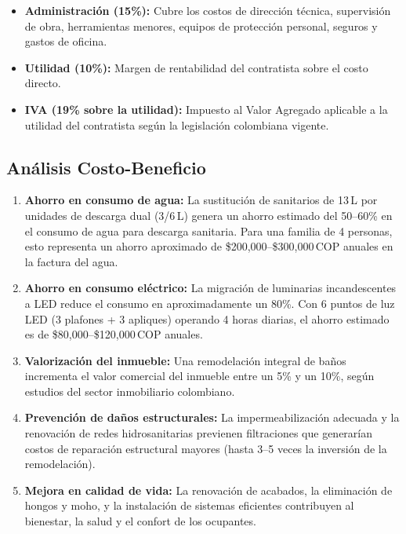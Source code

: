 ﻿\documentclass[12pt]{article}
\begin{document}
\begin{itemize}[noitemsep]
  \item {\bfseries Administración (15\%):} Cubre los costos de dirección técnica,
  supervisión de obra, herramientas menores, equipos de protección personal, seguros y
  gastos de oficina.
  \item {\bfseries Utilidad (10\%):} Margen de rentabilidad del contratista sobre el costo directo.
  \item {\bfseries IVA (19\% sobre la utilidad):} Impuesto al Valor Agregado aplicable a la utilidad
  del contratista según la legislación colombiana vigente.
\end{itemize}

\subsection{Análisis Costo-Beneficio}

\begin{enumerate}[noitemsep]
  \item {\bfseries Ahorro en consumo de agua:} La sustitución de sanitarios de 13\,L por unidades
  de descarga dual (3/6\,L) genera un ahorro estimado del 50--60\% en el consumo de agua para
  descarga sanitaria. Para una familia de 4 personas, esto representa un ahorro aproximado de
  \$200,000--\$300,000\,COP anuales en la factura del agua.
  \item {\bfseries Ahorro en consumo eléctrico:} La migración de luminarias incandescentes a
  LED reduce el consumo en aproximadamente un 80\%. Con 6 puntos de luz LED (3 plafones + 3 apliques)
  operando 4 horas diarias, el ahorro estimado es de \$80,000--\$120,000\,COP anuales.
  \item {\bfseries Valorización del inmueble:} Una remodelación integral de baños
  incrementa el valor comercial del inmueble entre un 5\% y un 10\%, según estudios del sector
  inmobiliario colombiano.
  \item {\bfseries Prevención de daños estructurales:} La impermeabilización adecuada y la
  renovación de redes hidrosanitarias previenen filtraciones que generarían costos de
  reparación estructural mayores (hasta 3--5 veces la inversión de la remodelación).
  \item {\bfseries Mejora en calidad de vida:} La renovación de acabados, la eliminación de
  hongos y moho, y la instalación de sistemas eficientes contribuyen al bienestar, la salud y el
  confort de los ocupantes.
\end{enumerate}
\end{document}
